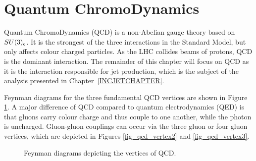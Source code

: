

\section{Quantum ChromoDynamics}

Quantum ChromoDynamics (QCD) is a non-Abelian gauge theory based on $SU(3)_c$. It is the strongest of the three interactions in the Standard Model, but only affects colour charged particles. As the LHC collides beams of protons, QCD is the dominant interaction. The remainder of this chapter will focus on QCD as it is the interaction responsible for jet production, which is the subject of the analysis presented in Chapter~\ref{INCJETCHAPTER}.


Feynman diagrams for the three fundamental QCD vertices are shown in Figure \ref{qcd_diagram_vertices}. A major difference of QCD compared to quantum electrodynamics (QED) is that gluons carry colour charge and thus couple to one another, while the photon is uncharged. Gluon-gluon couplings can occur via the three gluon or four gluon vertices, which are depicted in Figures \ref{fig_qcd_vertex2} and \ref{fig_qcd_vertex3}. %

\begin{figure}[tb]
\begin{center}
\caption{Feynman diagrams depicting the vertices of QCD.}
\label{qcd_diagram_vertices}
\end{center}
\end{figure}


